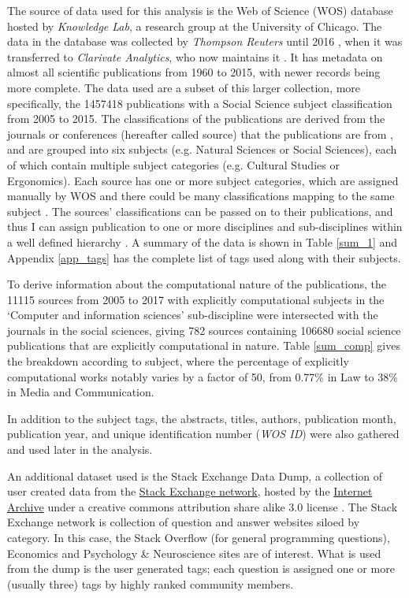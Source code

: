 \documentclass[12pt, a4paper]{article}
\begin{document}
The source of data used for this analysis is the Web of Science (WOS) database hosted by \textit{Knowledge Lab}, a research group at the University of Chicago. The data in the database was collected by \textit{Thompson Reuters} until 2016 , when it was transferred to \textit{Clarivate Analytics}, who now maintains it \citep{clarivate}. It has metadata on almost all scientific publications from 1960 to 2015, with newer records being more complete. The data used are a subset of this larger collection, more specifically, the \num{1457418} publications with a Social Science subject classification from 2005 to 2015. The classifications of the publications are derived from the journals or conferences (hereafter called source) that the publications are from  \citep{kottawos}, and are grouped into six subjects (e.g. Natural Sciences or Social Sciences), each of which contain multiple subject categories (e.g. Cultural Studies or Ergonomics). Each source has one or more subject categories, which are assigned manually by WOS and there could be many classifications mapping to the same subject \citep{efremenkova2016comparison}. The sources' classifications can be passed on to their publications, and thus I can assign publication to one or more disciplines and sub-disciplines within a well defined hierarchy \citep{wossubjects}. A summary of the data is shown in Table \ref{sum_1} and Appendix \ref{app_tags} has the complete list of tags used along with their subjects.

To derive information about the computational nature of the publications, the \num{11115} sources from 2005 to 2017 with explicitly computational subjects in the `Computer and information sciences' sub-discipline were intersected with the journals in the social sciences, giving \num{782} sources containing \num{106680} social science publications that are explicitly computational in nature. Table \ref{sum_comp} gives the breakdown according to subject, where the percentage of explicitly computational works notably varies by a factor of \num{50}, from \num{0.77}\% in Law to \num{38}\% in Media and Communication. 

In addition to the subject tags, the abstracts, titles, authors, publication month, publication year, and unique identification number (\textit{WOS ID}) were also gathered and used later in the analysis.

An additional dataset used is the Stack Exchange Data Dump, a collection of user created data from the \href{http://stackexchange.com/}{Stack Exchange network}, hosted by the \href{https://archive.org/details/stackexchange}{Internet Archive} under a creative commons attribution share alike 3.0 license \citep{StackExchange}. The Stack Exchange network is collection of question and answer websites siloed by category. In this case, the Stack Overflow (for general programming questions), Economics and Psychology \& Neuroscience sites are of interest. What is used from the dump is the user generated tags; each question is assigned one or more (usually three) tags by highly ranked community members.
\end{document}
